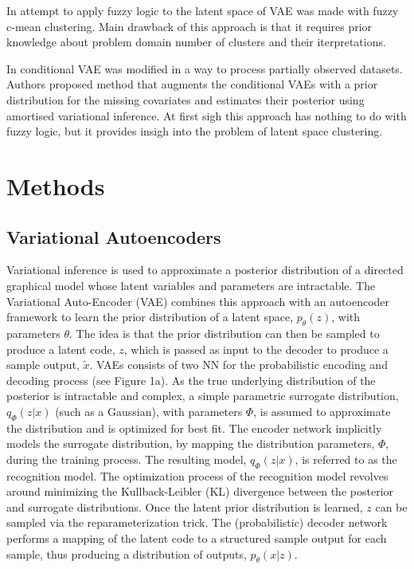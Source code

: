 \documentclass[runningheads]{llncs}
\begin{document}
In \cite{Bolat2020} attempt to apply fuzzy logic to the latent space of VAE was made with fuzzy c-mean clustering.
Main drawback of this approach is that it requires prior knowledge about problem domain number of clusters and their iterpretations.



In \cite{RAMCHANDRAN2024110113} conditional VAE was modified in a way to process partially observed datasets. 
Authors proposed method that augments the conditional VAEs with a prior distribution for the missing covariates and estimates their posterior using amortised variational inference.
At first sigh this approach has nothing to do with fuzzy logic, but it provides insigh into the problem of latent space clustering.



\section{Methods}

\subsection{Variational Autoencoders}
Variational inference is used to approximate a posterior distribution of a directed graphical model whose latent variables and parameters are intractable.
The Variational Auto-Encoder (VAE) combines this approach with an autoencoder framework to learn the prior distribution of a latent space, $p_\theta(z)$, with parameters $\theta$.
The idea is that the prior distribution can then be sampled to produce a latent code, $z$, which is passed as input to the decoder to produce a sample output, $\tilde{x}$. 
VAEs consists of two NN for the probabilistic encoding and decoding process (see Figure 1a). 
As the true underlying distribution of the posterior is intractable and complex, a simple parametric surrogate distribution, $q_\Phi(z|x)$ (such as a Gaussian), with parameters $\Phi$, is assumed to approximate the distribution and is optimized for best fit. 
The encoder network implicitly models the surrogate distribution, by mapping the distribution parameters, $\Phi$, during the training process. 
The resulting model, $q_\Phi(z|x)$, is referred to as the recognition model. 
The optimization process of the recognition model revolves around minimizing the Kullback-Leibler (KL) divergence between the posterior and surrogate distributions.
Once the latent prior distribution is learned, $z$ can be sampled via the reparameterization trick.
The (probabilistic) decoder network performs a mapping of the latent code to a structured sample output for each sample, thus producing a distribution of outputs, $p_\theta (x|z)$.
\end{document}
